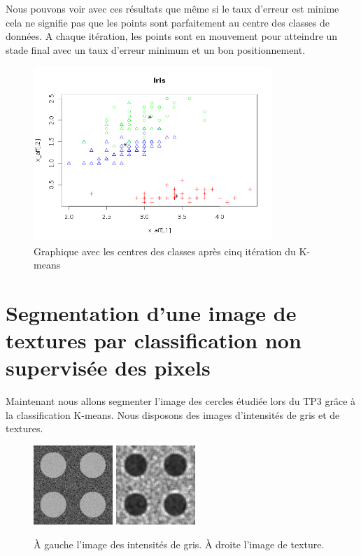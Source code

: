 \documentclass[a4paper,11pt]{article}
\begin{document}
  Nous pouvons voir avec ces résultats que même si le taux d'erreur est minime cela ne signifie pas
  que les points sont parfaitement au centre des classes de données. A chaque itération, les points
  sont en mouvement pour atteindre un stade final avec un taux d'erreur minimum et un bon positionnement.
  \begin{figure}[H]
    \center
    \includegraphics[width=9cm]{resultat/5_ite.png}
    \caption{Graphique avec les centres des classes après cinq itération du K-means}
  \end{figure}
  
  
  \section{Segmentation d'une image de textures par classification non supervisée des pixels}
  Maintenant nous allons segmenter l'image des cercles étudiée lors du TP3 grâce à la classification
  K-means. Nous disposons des images d'intensités de gris et de textures.
  
  \begin{figure}[H]
    \center
    \includegraphics[width=3cm]{resultat/rdf-2-classes-texture-1.png}
    \includegraphics[width=3cm]{resultat/rdf-2-classes-texture-1-text.png}
    \caption{À gauche l'image des intensités de gris. À droite l'image de texture.}
  \end{figure}
  
\end{document}
